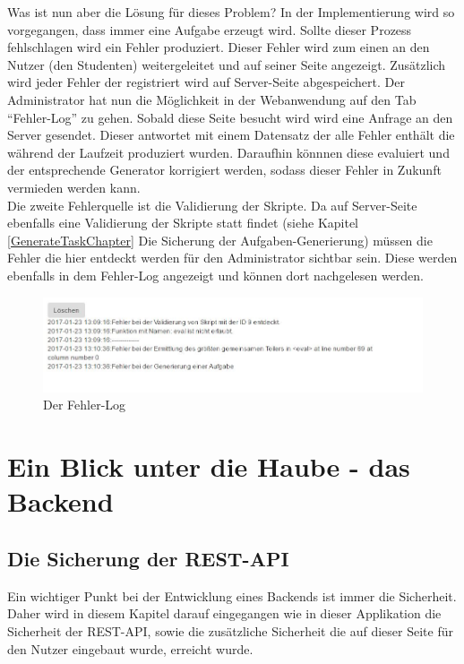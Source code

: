 Was ist nun aber die Lösung für dieses Problem? In der Implementierung wird so vorgegangen, dass immer eine Aufgabe erzeugt wird. Sollte dieser Prozess fehlschlagen wird ein Fehler produziert. Dieser Fehler wird zum einen an den Nutzer (den Studenten) weitergeleitet und auf seiner Seite angezeigt. Zusätzlich wird jeder Fehler der registriert wird auf Server-Seite abgespeichert. Der Administrator hat nun die Möglichkeit in der Webanwendung auf den Tab ``Fehler-Log'' zu gehen. Sobald diese Seite besucht wird wird eine Anfrage an den Server gesendet. Dieser antwortet mit einem Datensatz der alle Fehler enthält die während der Laufzeit produziert wurden. Daraufhin könnnen diese evaluiert und der entsprechende Generator korrigiert werden, sodass dieser Fehler in Zukunft vermieden werden kann. \\

Die zweite Fehlerquelle ist die Validierung der Skripte. Da auf Server-Seite ebenfalls eine Validierung der Skripte statt findet (siehe Kapitel \ref{GenerateTaskChapter} Die Sicherung der Aufgaben-Generierung) müssen die Fehler die hier entdeckt werden für den Administrator sichtbar sein. Diese werden ebenfalls in dem Fehler-Log angezeigt und können dort nachgelesen werden.

\begin{figure}[htp]     %
\centering
\includegraphics[width=1\textwidth]{bilder/ErrorLog} 
\caption[Der Fehler-Log]{Der Fehler-Log}
\end{figure} 




\chapter{Ein Blick unter die Haube - das Backend}

\section{Die Sicherung der REST-API}

Ein wichtiger Punkt bei der Entwicklung eines Backends ist immer die Sicherheit. Daher wird in diesem Kapitel darauf eingegangen wie in dieser Applikation die Sicherheit der REST-API, sowie die zusätzliche Sicherheit die auf dieser Seite für den Nutzer eingebaut wurde, erreicht wurde. \\


